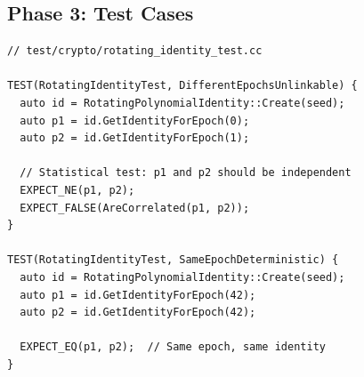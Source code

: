 \documentclass[11pt]{article}
\begin{document}
\subsection{Phase 3: Test Cases}

\begin{verbatim}
// test/crypto/rotating_identity_test.cc

TEST(RotatingIdentityTest, DifferentEpochsUnlinkable) {
  auto id = RotatingPolynomialIdentity::Create(seed);
  auto p1 = id.GetIdentityForEpoch(0);
  auto p2 = id.GetIdentityForEpoch(1);

  // Statistical test: p1 and p2 should be independent
  EXPECT_NE(p1, p2);
  EXPECT_FALSE(AreCorrelated(p1, p2));
}

TEST(RotatingIdentityTest, SameEpochDeterministic) {
  auto id = RotatingPolynomialIdentity::Create(seed);
  auto p1 = id.GetIdentityForEpoch(42);
  auto p2 = id.GetIdentityForEpoch(42);

  EXPECT_EQ(p1, p2);  // Same epoch, same identity
}
\end{verbatim}
\end{document}
